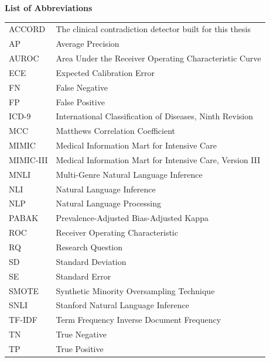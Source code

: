 \begin{frontmatterpage}
  {\centering\normalsize\bfseries List of Abbreviations\par}\vspace{\baselineskip}
  \doublespacing
  {\setlength{\tabcolsep}{0pt}%
  \begin{longtable}{@{}p{1.1in}p{4.6in}@{}}
    ACCORD  & The clinical contradiction detector built for this thesis\\
    AP      & Average Precision\\
    AUROC   & Area Under the Receiver Operating Characteristic Curve\\
    ECE     & Expected Calibration Error\\
    FN      & False Negative\\
    FP      & False Positive\\
    ICD-9   & International Classification of Diseases, Ninth Revision\\
    MCC     & Matthews Correlation Coefficient\\
    MIMIC   & Medical Information Mart for Intensive Care\\
    MIMIC-III & Medical Information Mart for Intensive Care, Version III\\
    MNLI    & Multi-Genre Natural Language Inference\\
    NLI     & Natural Language Inference\\
    NLP     & Natural Language Processing\\
    PABAK   & Prevalence-Adjusted Bias-Adjusted Kappa\\
    ROC     & Receiver Operating Characteristic\\
    RQ      & Research Question\\
    SD      & Standard Deviation\\
    SE      & Standard Error\\
    SMOTE   & Synthetic Minority Oversampling Technique\\
    SNLI    & Stanford Natural Language Inference\\
    TF-IDF  & Term Frequency Inverse Document Frequency\\
    TN      & True Negative\\
    TP      & True Positive\\
  \end{longtable}}
\end{frontmatterpage}
